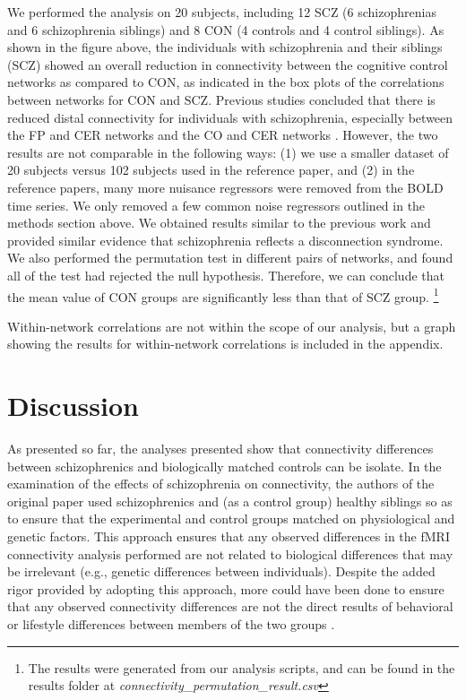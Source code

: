 \documentclass[11pt]{article}
\begin{document}
We performed the analysis on 20 subjects, including 12 SCZ (6 schizophrenias and 6 schizophrenia siblings) and 8 CON (4 controls and 4 control siblings). As shown in the figure above, the individuals with schizophrenia and their siblings (SCZ) showed an overall reduction in connectivity between the cognitive control networks as compared to CON, as indicated in the box plots of the correlations between networks for CON and SCZ. Previous studies concluded that there is reduced distal connectivity for individuals with schizophrenia, especially between the FP and CER networks and the CO and CER networks \cite{repovs2011, repovs2012}. However, the two results are not comparable in the following ways: (1) we use a smaller dataset of 20 subjects versus 102 subjects used in the reference paper, and (2) in the reference papers, many more nuisance regressors were removed from the BOLD time series. We only removed a few common noise regressors outlined in the methods section above. We obtained results similar to the previous work and provided similar evidence that schizophrenia reflects a disconnection syndrome.
We also performed the permutation test in different pairs of networks, and found all of the test had rejected the null hypothesis.  Therefore, we can conclude that the mean value of CON groups are significantly less than that of SCZ group. \footnote{The results were generated from our analysis scripts, and can be found in the results folder at \textit{connectivity\_permutation\_result.csv}}


Within-network correlations are not within the scope of our analysis, but a graph showing the results for within-network correlations is included in the appendix.


\section{Discussion}

As presented so far, the analyses presented show that connectivity differences
between schizophrenics and biologically matched controls can be isolate. In the
examination of the effects of schizophrenia on connectivity, the authors of the
original paper used schizophrenics and (as a control group) healthy siblings so
as to ensure that the experimental and control groups matched on physiological
and genetic factors. This approach ensures that any observed differences in the
fMRI connectivity analysis performed are not related to biological differences
that may be irrelevant (e.g., genetic differences between individuals). Despite
the added rigor provided by adopting this approach, more could have been done to
ensure that any observed connectivity differences are not the direct results of
behavioral or lifestyle differences between members of the two groups \cite{gur2010functional}. 
\end{document}
